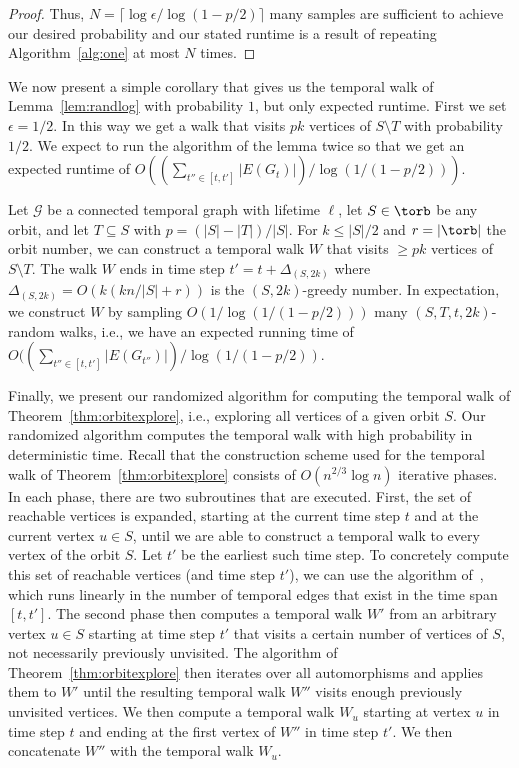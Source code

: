 {{\begin{proof}
    Thus, {$N = \lceil \log \epsilon/\log(1-p/2) \rceil$} many
    samples are sufficient to achieve our desired probability and our stated
    runtime is a result of repeating Algorithm~\ref{alg:one} at most $N$ times.
\end{proof}
}
{We now present a simple corollary that gives us the temporal walk
    of Lemma~\ref{lem:randlog} with probability $1$, but only expected runtime.
    First we set $\epsilon=1/2$. In this way we get a walk
    that visits $pk$ vertices of $S\setminus T$ with probability $1/2$. 
    We expect to run the algorithm of the lemma twice so that
    we get an
    expected runtime of $O((\sum_{t'' \in [t, t']} |E(G_t)|)/ \log(1/(1-p/2)))$.

\begin{corollary}\label{cor:expfraction}
    Let $\mathcal{G}$ be a connected temporal graph with lifetime $\ell$, let
    $S \in \torb$ be any orbit, and let $T \subseteq S$ with $p=(|S|-|T|)/|S|$.
    For $k \leq |S|/2$ and $r=|\torb|$ the orbit number, we can construct a
    temporal walk $W$ that visits $\geq p k$ vertices of $S \setminus T$. The
    walk $W$ ends in time step $t'=t+\Delta_{(S, 2k)}$ where $\Delta_{(S,
    2k)}=O(k(k n/|S|+r))$ is the $(S, 2k)$-greedy number. 
%
    {In expectation, we construct $W$ by 
    sampling $O(1/\log(1/(1-p/2)))$ many $(S, T, t, 2k)$-random walks, i.e.,
    we have}
    an expected running time of $O((\sum_{t'' \in [t, t']}|E(G_{t''})|)
    /\log(1/(1-p/2))$.
\end{corollary}
}

Finally, we present our randomized algorithm for computing the temporal walk of
Theorem~\ref{thm:orbitexplore}, i.e., exploring all vertices of a given orbit
$S$. Our randomized algorithm computes the temporal walk with high probability
in deterministic time. Recall that the construction scheme used
for the temporal walk of Theorem~\ref{thm:orbitexplore} consists of
$O(n^{2/3}\log n)$ iterative phases. In each phase, there are two subroutines
that are executed. First, the set of reachable vertices is expanded, starting at
the current time step $t$ and at the current vertex $u \in S$, until we are able
to construct a temporal walk to {every vertex} of the orbit $S$. Let $t'$ be the
earliest such time step. To concretely compute this set of reachable vertices
(and time step $t'$), we can use the algorithm of~\cite{WuCYSYW16}, which runs
linearly in the number of temporal edges that exist in the time span $[t, t']$.
The second phase then computes a temporal walk $W'$ from an arbitrary vertex $u
\in S$ starting at time step $t'$ that visits a certain number of vertices of
$S$, not necessarily previously unvisited. {The algorithm of Theorem~\ref{thm:orbitexplore} then
iterates} over all
automorphisms and {applies} them to $W'$ until the resulting temporal walk $W''$
visits enough previously unvisited vertices. We then compute a temporal walk
$W_u$ starting at vertex $u$ in time step $t$ and ending at the first vertex of
$W''$ in time step $t'$. We then concatenate $W''$ with the temporal walk $W_u$.

}
